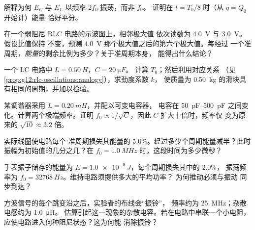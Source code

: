 \begin{exercise}[$\star\star$]\label{exo:g12:rlc-oscillations:9}
解释为何 $E_C$ 与 $E_L$ 以频率 $2f_0$ 振荡，而非 $f_0$。
证明在 $t = T_0/8$ 时（从 $q = Q_0$ 开始计）能量
恰好平分。
\end{exercise}

\begin{exercise}[$\star\star$]\label{exo:g12:rlc-oscillations:10}
在一个弱阻尼 RLC 电路的示波图上，相邻极大值
依次读数为 \qty{4.0}{V} 与 \qty{3.0}{V}。假设比值保持
不变，预测 \qty{4.0}{V} 那个极大值之后的第六个极大值。每经过
一个准周期，\emph{能量}的剩余比例为多少？关于准周期本身，
能得出什么结论？
\end{exercise}

\begin{exercise}[$\star\star$]\label{exo:g12:rlc-oscillations:11}
一个 LC 电路中 $L = \qty{0.50}{H}$，$C = \qty{20}{\micro F}$。
计算 $T_0$；然后利用对应关系
（见\cref{prop:g12:rlc-oscillations:analogy}），求劲度系数 $k$，
使质量为 \qty{0.50}{kg} 的滑块具有相同的周期，并加以检验。
\end{exercise}

\begin{exercise}[$\star\star\star$]\label{exo:g12:rlc-oscillations:12}
某调谐器采用 $L = \qty{0.20}{mH}$，并配以可变电容器，
电容在 \qtyrange{50}{500}{pF} 之间变化。计算两个极端频率。证明
$f_0 \propto 1/\sqrt{C}$，因此 $C$ 扩大十倍时，频率仅
变为原来的 $\sqrt{10} \approx 3.2$ 倍。
\end{exercise}

\begin{exercise}[$\star\star\star$]\label{exo:g12:rlc-oscillations:13}
实际线圈使电路每个
准周期损失其能量的 $5.0\%$。经过多少个周期能量减半？此时
振幅为初始值的几分之几？在
$f_0 = \qty{1.0}{MHz}$ 时，这段时间为多少微秒？
\end{exercise}

\begin{exercise}[$\star\star\star$]\label{exo:g12:rlc-oscillations:14}
手表振子储存的能量为 $E = \qty{1.0e-9}{J}$，每个周期损失其中的 $2.0\%$，
振荡频率为 $f_0 = \qty{32768}{Hz}$。维持电路须提供多大的平均功率？
为何推动必须与振动
同步到达？
\end{exercise}

\begin{exercise}[$\star\star\star$]\label{exo:g12:rlc-oscillations:15}
方波信号的每个跳变沿之后，实验者的布线会“振铃”，
频率约为 \qty{25}{MHz}；杂散电感约为 \qty{1.0}{\micro H}。
估算引起这一现象的杂散电容。若在电路中串联一个小电阻，
应使电路进入何种阻尼状态？这为何能
消除振铃？
\end{exercise}

